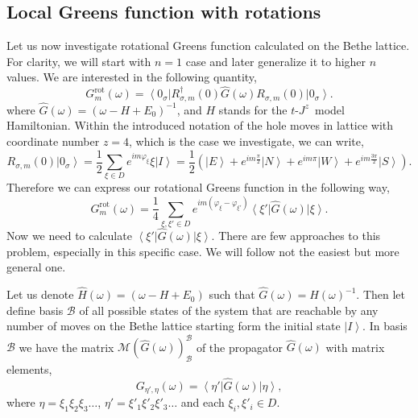 \documentclass{article}
\newcommand{\tjzm}{$t$-$J^z$~model}
\newcommand{\ket}[1]{\left\vert #1 \right\rangle}
\newcommand{\bra}[1]{\left\langle #1 \right\vert}
\begin{document}
\subsection{Local Greens function with rotations}
Let us now investigate rotational Greens function calculated on the Bethe lattice. For clarity, we will start with $n = 1$ case and later generalize it to higher $n$ values. We are interested in the following quantity,
\begin{equation}
    G^{\text{rot}}_{m}(\omega) = 
    \bra{0_\sigma}R^{\dag}_{\sigma,m}(0) 
        \hat{G}(\omega)
    R_{\sigma,m}(0) \ket{0_\sigma}.
\end{equation}
where $\hat{G}(\omega) = (\omega - H + E_0)^{-1}$, and $H$ stands for the \tjzm{} Hamiltonian. Within the introduced notation of the hole moves in lattice with coordinate number $z=4$, which is the case we investigate, we can write,
\begin{equation}
    R_{\sigma,m}(0) \ket{0_\sigma} = \frac{1}{2}\sum_{\xi \in D}
    e^{i m\varphi_\xi}\xi\ket{I} = \frac{1}{2}\left(\ket{E} + 
    e^{i m\frac{\pi}{2}}\ket{N} + e^{im\pi}\ket{W} + 
    e^{i m\frac{3\pi}{2}}\ket{S}\right).
\end{equation}
Therefore we can express our rotational Greens function in the following way,
\begin{equation}
    G^{\text{rot}}_{m}(\omega) = 
    \frac{1}{4}\sum_{\xi, \xi' \in D}
        e^{i m(\varphi_\xi - \varphi_{\xi'})}
        \bra{\xi'}\hat{G}(\omega)\ket{\xi}.
\end{equation}
Now we need to calculate $\bra{\xi'}\hat{G}(\omega)\ket{\xi}$. There are few approaches to this problem, especially in this specific case. We will follow not the easiest but more general one.

Let us denote $\hat{H}(\omega) = (\omega - H + E_0)$ such that $\hat{G}(\omega) = \hat{H}(\omega)^{-1}$. Then let define basis $\mathcal{B}$ of all possible states of the system that are reachable by any number of moves on the Bethe lattice starting form the initial state $\ket{I}$. In basis $\mathcal{B}$ we have the matrix $\mathcal{M}(\hat{G}(\omega))_\mathcal{B}^\mathcal{B}$ of the propagator $\hat{G}(\omega)$ with matrix elements,
\begin{equation}
    G_{\eta', \eta}(\omega) = \bra{\eta'}\hat{G}(\omega)\ket{\eta},
\end{equation}
where $\eta = \xi_1 \xi_2 \xi_3 \hdots$, $\eta' = \xi'_1 \xi'_2 \xi'_3 \hdots$ and each $\xi_i, \xi'_i \in D$. 
\end{document}
